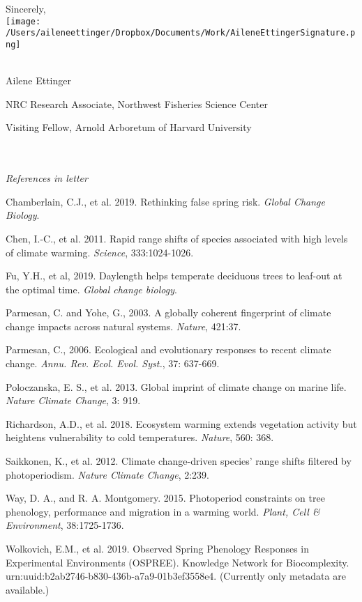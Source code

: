 \documentclass[10.7pt,a4paper]{letter} %
\begin{document}
\begin{letter}{}
Sincerely,\\
\texttt{[image: /Users/aileneettinger/Dropbox/Documents/Work/AileneEttingerSignature.png]} \\
\\
\begin{footnotesize}
Ailene Ettinger

NRC Research Associate, Northwest Fisheries Science Center

Visiting Fellow, Arnold Arboretum of Harvard University
\end{footnotesize}
\\
\\
\noindent \emph{References in letter}
\begin{footnotesize}

\item Chamberlain, C.J., et al. 2019. Rethinking false spring risk.  \emph{Global Change Biology}.

\item Chen, I.-C., et al. 2011. Rapid range shifts of species associated with high levels of climate warming.  \emph{Science}, 333:1024-1026.
\item Fu, Y.H., et al, 2019. Daylength helps temperate deciduous trees to leaf-out at the optimal time. \emph{Global change biology}.

\item Parmesan, C. and Yohe, G., 2003. A globally coherent fingerprint of climate change impacts across natural systems.  \emph{Nature}, 421:37.

\item Parmesan, C., 2006. Ecological and evolutionary responses to recent climate change.  \emph{Annu. Rev. Ecol. Evol. Syst.}, 37: 637-669.

\item Poloczanska, E. S., et al. 2013. Global imprint of climate change on marine life. \emph{Nature Climate Change}, 3: 919.

\item Richardson, A.D., et al. 2018. Ecosystem warming extends vegetation activity but heightens vulnerability to cold temperatures. \emph{Nature}, 560: 368.

\item Saikkonen, K., et al. 2012. Climate change-driven species' range shifts filtered by photoperiodism. \emph{Nature Climate Change}, 2:239.

\item Way, D. A., and R. A. Montgomery. 2015. Photoperiod constraints on tree phenology, performance and migration in a warming world. \emph{Plant, Cell \& Environment}, 38:1725-1736.
\item Wolkovich, E.M.,  et al. 2019. Observed Spring Phenology Responses in Experimental Environments (OSPREE). Knowledge Network for Biocomplexity. urn:uuid:b2ab2746-b830-436b-a7a9-01b3ef3558e4. (Currently only metadata are available.)


\end{footnotesize}
\end{letter}
\end{document}
